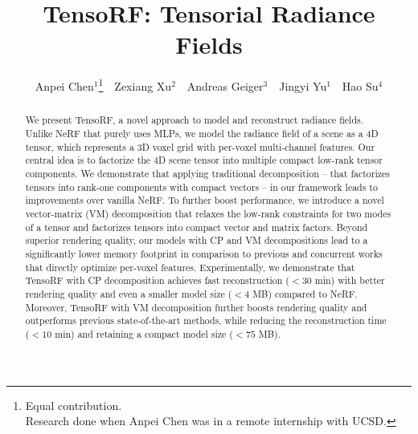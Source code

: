 \documentclass[runningheads]{llncs}
\makeatletter
\newcommand{\printfnsymbol}[1]{\textsuperscript{\@fnsymbol{#1}}}
\makeatother
\begin{document}
\pagestyle{headings}
\mainmatter

\title{TensoRF: Tensorial Radiance Fields} 





\author{Anpei Chen$^1$\thanks{Equal contribution.\\ Research done when Anpei Chen was in a remote internship with UCSD.}
\,\,
Zexiang Xu$^{2}$\printfnsymbol{1}
\,\,
Andreas Geiger$^3$ 
\,\,
Jingyi Yu$^1$
\,\,
Hao Su$^4$ 
}




\maketitle

\begin{abstract}
We present TensoRF, a novel approach to model and reconstruct radiance fields.
Unlike NeRF that purely uses MLPs, we model the radiance field of a scene as a 4D tensor, which represents a 3D voxel grid with per-voxel multi-channel features.
Our central idea is to factorize the 4D scene tensor into multiple compact low-rank tensor components. 
We demonstrate that applying traditional  decomposition -- that factorizes tensors into rank-one components with compact vectors -- in our framework leads to improvements over vanilla NeRF. 
To further boost performance, we introduce a novel vector-matrix (VM) decomposition that relaxes the low-rank constraints for two modes of a tensor and factorizes tensors into compact vector and matrix factors. 
Beyond superior rendering quality, our models with CP and VM decompositions lead to a significantly lower memory footprint in comparison to previous and concurrent works that directly optimize per-voxel features.
Experimentally, we demonstrate that TensoRF with CP decomposition achieves fast reconstruction ($<30$ min) with better rendering quality and even a smaller model size ($<4$ MB) compared to NeRF.
Moreover, TensoRF with VM decomposition further boosts rendering quality and outperforms previous state-of-the-art methods, while reducing the reconstruction time ($<10$ min) and retaining a compact model size ($<75$ MB).



%
 \end{abstract}
\end{document}
